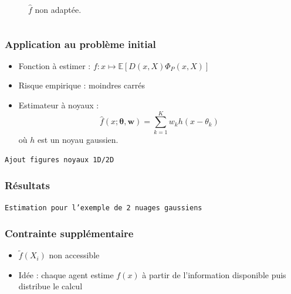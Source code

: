 \documentclass[c]{beamer}
\begin{document}
\begin{frame}
\begin{columns}
\begin{column}{.5\textwidth}
\begin{figure}
        \caption{$\hat{f}$ non adapt\'ee.}
      \end{figure}
    \end{column}
  \end{columns}
\end{frame}

\begin{frame}
  \frametitle{Application au problème initial}

  \begin{itemize}
    \item Fonction à estimer : $f : x \mapsto \mathbb{E}\left[ D(x,X) \Phi_P(x,X) \right]$
    \item Risque empirique : moindres carr\'es
    \item Estimateur à noyaux :
      \[
          \hat{f}(x; \mathbf{\theta}, \mathbf{w}) = \sum_{k=1}^K w_k h(x - \theta_k)
      \]
      où $h$ est un noyau gaussien.
  \end{itemize}
  \texttt{Ajout figures noyaux 1D/2D}
\end{frame}

\begin{frame}
    \frametitle{Résultats}

    \texttt{Estimation pour l'exemple de 2 nuages gaussiens}
\end{frame}

\begin{frame}
    \frametitle{Contrainte supplémentaire}

    \begin{itemize}
        \item $\tilde{f}(X_i)$ non accessible
        \item Idée : chaque agent estime $f(x)$ à partir de l'information disponible
            puis distribue le calcul
    \end{itemize}
\end{frame}
\end{document}
